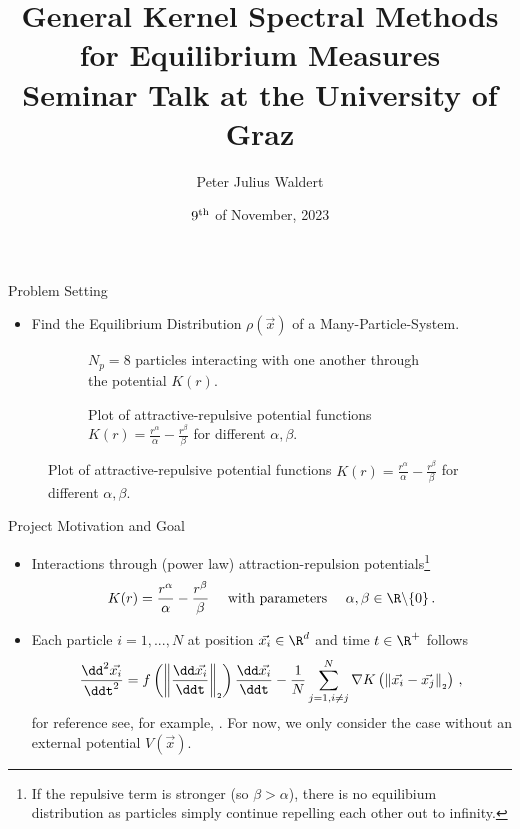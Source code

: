\documentclass[aspectratio=169, hyperref={colorlinks=true}]{beamer}
\title{General Kernel Spectral Methods for Equilibrium Measures \\ \normalsize Seminar Talk at the University of Graz}
\author{Peter Julius Waldert}
\institute{Mathematical Institute \\ University of Oxford}
\date{$9^{\rm th}$ of November, 2023}
\begin{document}
  {\frame{\titlepage}}

  \begin{frame}{Problem Setting}
    \begin{itemize}
      \item Find the Equilibrium Distribution $\rho(\vec{x})$ of a Many-Particle-System.
    \end{itemize}
    \begin{figure}[H]
      \centering
      \begin{subfigure}[t]{0.5\textwidth}
        \centering
        \caption*{$N_p = 8$ particles interacting with one another through the potential $K(r)$.}
      \end{subfigure}
      \hfill
      \begin{subfigure}[t]{0.49\textwidth}
        \centering
        \caption*{Plot of attractive-repulsive potential functions $K(r) = \frac{r^\alpha}{\alpha} - \frac{r^\beta}{\beta}$ for different $\alpha, \beta$.}
      \end{subfigure}
    \end{figure}
  \end{frame}

  {
  \begin{frame}{Project Motivation and Goal}
    \vspace{0.4cm}
    \begin{itemize}
      \item Interactions through (power law) attraction-repulsion potentials\footnote{If the repulsive term is stronger (so $\beta > \alpha$), there is no equilibium distribution as particles simply continue repelling each other out to infinity.}
            $$K(r) = \frac{r^\alpha}{\alpha} - \frac{r^\beta}{\beta}\quad \text{ with parameters } \quad \alpha, \beta \in \R \backslash \{0\}\,.$$
      \item Each particle $i=1, ..., N$ at position $\vec{x_i} \in \R^d$ and time $t \in \R^+$ follows
            $$\frac{\dd^2 \vec{x_i}}{\ddt^2} = f\left(\norm{\frac{\dd \vec{x_i}}{\ddt}}\right) \frac{\dd\vec{x_i}}{\ddt} - \frac{1}{N} \sum_{j=1, i\neq j}^{N} \nabla K\left(\norm{\vec{x_i} - \vec{x_j}}\right)\,,$$
            for reference see, for example, \parencite{2020-power-law-kernels, 2021-arbitrary-dimensions}.
            For now, we only consider the case without an external potential $V(\vec{x})$.
    \end{itemize}
  \end{frame}
  }
\end{document}
